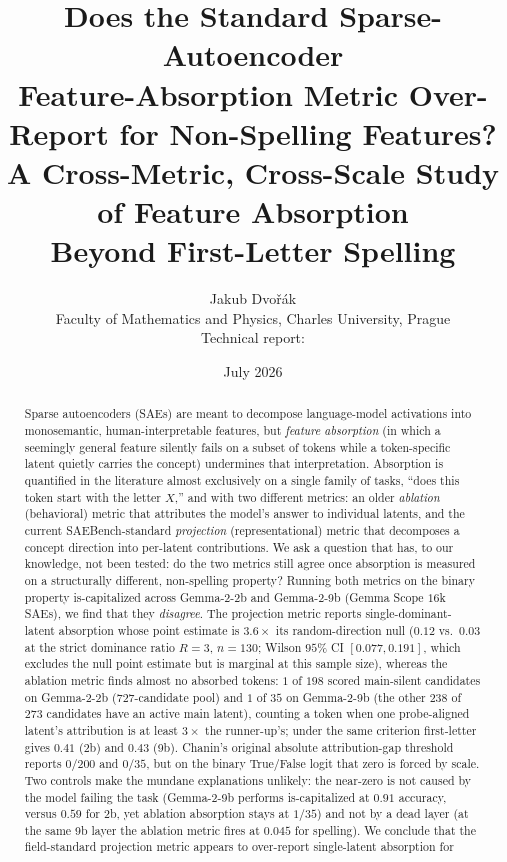 \documentclass[11pt]{article}
\title{\bfseries Does the Standard Sparse-Autoencoder \\ Feature-Absorption Metric Over-Report for Non-Spelling Features?\\[3pt]
\large A Cross-Metric, Cross-Scale Study of Feature Absorption \\ Beyond First-Letter Spelling}
\author{Jakub Dvo\v{r}\'ak\\[2pt]
\normalsize Faculty of Mathematics and Physics, Charles University, Prague\\
\normalsize Technical report: \code{absorption-atlas}}
\date{July 2026}
\newcommand{\iscap}{\textsf{is-capitalized}}
\theoremstyle{definition}
\begin{document}
\maketitle

\begin{abstract}
\noindent
Sparse autoencoders (SAEs) are meant to decompose language-model activations into monosemantic,
human-interpretable features, but \emph{feature absorption} (in which a seemingly general feature
silently fails on a subset of tokens while a token-specific latent quietly carries the concept)
undermines that interpretation. Absorption is quantified in the literature almost exclusively on a
single family of tasks, ``does this token start with the letter $X$,'' and with two different metrics:
an older \emph{ablation} (behavioral) metric that attributes the model's answer to individual latents,
and the current SAEBench-standard \emph{projection} (representational) metric that decomposes a
concept direction into per-latent contributions. We ask a question that has, to our knowledge, not
been tested: do the two metrics still agree once absorption is measured on a structurally different,
non-spelling property? Running both metrics on the binary property \iscap{} across Gemma-2-2b and
Gemma-2-9b (Gemma Scope $16$k SAEs), we find that they \emph{disagree}. The projection metric reports
single-dominant-latent absorption whose point estimate is $3.6\times$ its random-direction null
($0.12$ vs.\ $0.03$ at the strict dominance ratio $R{=}3$, $n{=}130$; Wilson $95\%$ CI $[0.077,0.191]$,
which excludes the null point estimate but is marginal at this sample size), whereas the ablation
metric finds almost no absorbed tokens: $1$ of $198$ scored main-silent candidates on Gemma-2-2b
($727$-candidate pool) and $1$ of $35$ on Gemma-2-9b (the other $238$ of $273$ candidates have an active
main latent), counting a token when one probe-aligned latent's attribution is at least $3\times$ the
runner-up's; under the same criterion first-letter gives $0.41$ (2b) and $0.43$ (9b). Chanin's original
absolute attribution-gap threshold reports $0/200$ and $0/35$, but on the binary True/False logit that zero
is forced by scale. Two controls make the mundane explanations unlikely: the near-zero is not caused by the
model failing the task (Gemma-2-9b performs \iscap{} at $0.91$ accuracy, versus $0.59$ for 2b, yet
ablation absorption stays at $1/35$) and not by a dead layer (at the same 9b layer the ablation metric
fires at $0.045$ for spelling). We
conclude that the field-standard projection metric appears to over-report single-latent absorption for

\end{abstract}
\end{document}

